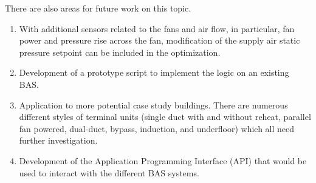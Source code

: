 There are also areas for future work on this topic.

\begin{enumerate}
    \item With additional sensors related to the fans and air flow, in
        particular, fan power and pressure rise across the fan,
        modification of the supply air static pressure setpoint can be
        included in the optimization.
    \item Development of a prototype script to implement the logic on an
        existing BAS.
    \item Application to more potential case study buildings. There are
        numerous different styles of terminal units (single duct with
        and without reheat, parallel fan powered, dual-duct, bypass,
        induction, and underfloor) which all need
        further investigation. 
    \item Development of the Application Programming Interface (API)
        that would be used to interact with the different BAS systems.
\end{enumerate}


